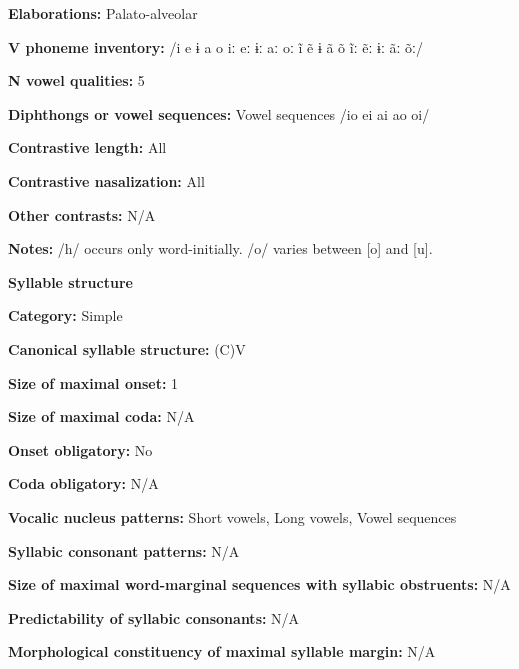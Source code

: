 \textbf{Elaborations:} Palato-alveolar



\textbf{V phoneme inventory:} /i e ɨ a o iː eː ɨː aː oː ĩ ẽ ɨ ã õ ĩː ẽː ɨː ãː õː/



\textbf{N vowel qualities:} 5



\textbf{Diphthongs or vowel sequences:} Vowel sequences /io ei ai ao oi/



\textbf{Contrastive length:} All



\textbf{Contrastive nasalization:} All



\textbf{Other contrasts:} N/A



\textbf{Notes:} /h/ occurs only word-initially. /o/ varies between [o] and [u]. 



\textbf{Syllable structure}



\textbf{Category:} Simple



\textbf{Canonical syllable structure:} (C)V \citep[87-90]{Facundes2000}



\textbf{Size of maximal onset:} 1



\textbf{Size of maximal coda:} N/A



\textbf{Onset obligatory:} No



\textbf{Coda obligatory:} N/A



\textbf{Vocalic nucleus patterns:} Short vowels, Long vowels, Vowel sequences



\textbf{Syllabic consonant patterns:} N/A



\textbf{Size of maximal word{}-marginal sequences with syllabic obstruents:}  N/A



\textbf{Predictability of syllabic consonants:} N/A



\textbf{Morphological constituency of maximal syllable margin:} N/A



